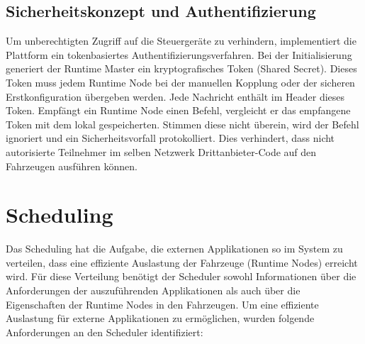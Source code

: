 \subsection{Sicherheitskonzept und Authentifizierung}
Um unberechtigten Zugriff auf die Steuergeräte zu verhindern, implementiert die Plattform ein tokenbasiertes Authentifizierungsverfahren. Bei der Initialisierung generiert der Runtime Master ein kryptografisches Token (Shared Secret). Dieses Token muss jedem Runtime Node bei der manuellen Kopplung oder der sicheren Erstkonfiguration übergeben werden.
Jede Nachricht enthält im Header dieses Token. Empfängt ein Runtime Node einen Befehl, vergleicht er das empfangene Token mit dem lokal gespeicherten. Stimmen diese nicht überein, wird der Befehl ignoriert und ein Sicherheitsvorfall protokolliert. Dies verhindert, dass nicht autorisierte Teilnehmer im selben Netzwerk Drittanbieter-Code auf den Fahrzeugen ausführen können.

\section{Scheduling}

Das Scheduling hat die Aufgabe, die externen Applikationen so im System zu verteilen, dass eine effiziente Auslastung der Fahrzeuge (Runtime Nodes) erreicht wird. Für diese Verteilung benötigt der Scheduler sowohl Informationen über die Anforderungen der auszuführenden Applikationen als auch über die Eigenschaften der Runtime Nodes in den Fahrzeugen. Um eine effiziente Auslastung für externe Applikationen zu ermöglichen, wurden folgende Anforderungen an den Scheduler identifiziert:

